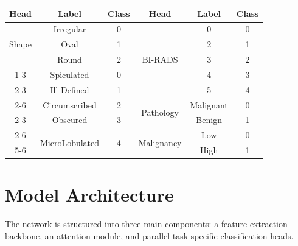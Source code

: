 \documentclass[11pt,a4paper]{article}
\begin{document}
\begin{center}
    \label{table:label_mapping}
    \begin{tabular}{|c|c|c|c|c|c|}
        \hline
        Head                    & Label                           & Class              & Head                        & Label     & Class \\ \hline
        \multirow{3}{*}{Shape}  & Irregular                       & 0                  & \multirow{5}{*}{BI-RADS}    & 0         & 0     \\ \cline{2-3} \cline{5-6} 
                                & Oval                            & 1                  &                             & 2         & 1     \\ \cline{2-3} \cline{5-6} 
                                & Round                           & 2                  &                             & 3         & 2     \\ \cline{1-3} \cline{5-6} 
        \multirow{6}{*}{Margin} & Spiculated                      & 0                  &                             & 4         & 3     \\ \cline{2-3} \cline{5-6} 
                                & Ill-Defined                     & 1                  &                             & 5         & 4     \\ \cline{2-6} 
                                & Circumscribed                   & 2                  & \multirow{2}{*}{Pathology}  & Malignant & 0     \\ \cline{2-3} \cline{5-6} 
                                & Obscured                        & 3                  &                             & Benign    & 1     \\ \cline{2-6} 
                                & \multirow{2}{*}{MicroLobulated} & \multirow{2}{*}{4} & \multirow{2}{*}{Malignancy} & Low       & 0     \\ \cline{5-6} 
                                &                                 &                    &                             & High      & 1     \\ \hline
    \end{tabular}
\end{center}

\section{Model Architecture}
The network is structured into three main components: a feature extraction backbone, an attention module, and parallel task-specific classification heads.
\end{document}
